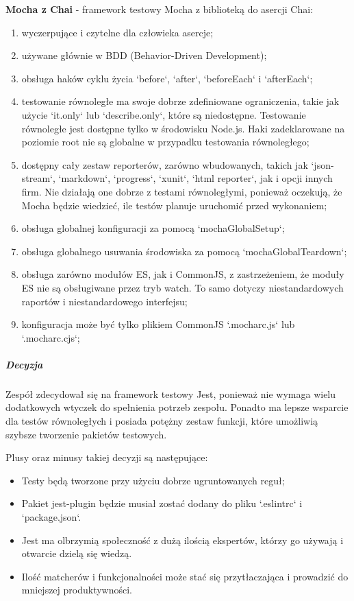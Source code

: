\documentclass[12pt, a4paper, twoside, openany]{book}
\begin{document}
\textbf{Mocha z Chai} - framework testowy Mocha z biblioteką do asercji Chai:
\begin{enumerate}[label=--]
    \item wyczerpujące i czytelne dla człowieka asercje;
    \item używane głównie w BDD (Behavior-Driven Development);
    \item obsługa haków cyklu życia `before`, `after`, `beforeEach` i `afterEach`;
    \item testowanie równoległe ma swoje dobrze zdefiniowane ograniczenia, takie jak użycie `it.only` lub `describe.only`, które są niedostępne. Testowanie równoległe jest dostępne tylko w środowisku Node.js. Haki zadeklarowane na poziomie root nie są globalne w przypadku testowania równoległego;
    \item dostępny cały zestaw reporterów, zarówno wbudowanych, takich jak `json-stream`, `markdown`, `progress`, `xunit`, `html reporter`, jak i opcji innych firm. Nie działają one dobrze z testami równoległymi, ponieważ oczekują, że Mocha będzie wiedzieć, ile testów planuje uruchomić przed wykonaniem;
    \item obsługa globalnej konfiguracji za pomocą `mochaGlobalSetup`;
    \item obsługa globalnego usuwania środowiska za pomocą `mochaGlobalTeardown`;
    \item obsługa zarówno modułów ES, jak i CommonJS, z zastrzeżeniem, że moduły ES nie są obsługiwane przez tryb watch. To samo dotyczy niestandardowych raportów i niestandardowego interfejsu;
    \item konfiguracja może być tylko plikiem CommonJS `.mocharc.js` lub `.mocharc.cjs`;
\end{enumerate}

\subparagraph{Decyzja\\}

Zespół zdecydował się na framework testowy Jest, ponieważ nie wymaga wielu dodatkowych wtyczek do spełnienia potrzeb zespołu. Ponadto ma lepsze wsparcie dla testów równoległych i posiada potężny zestaw funkcji, które umożliwią szybsze tworzenie pakietów testowych.

Plusy oraz minusy takiej decyzji są następujące:
\begin{itemize}
    \item Testy będą tworzone przy użyciu dobrze ugruntowanych reguł;
    \item Pakiet jest-plugin będzie musiał zostać dodany do pliku `.eslintrc` i `package.json`.
    \item Jest ma olbrzymią społeczność z dużą ilością ekspertów, którzy go używają i otwarcie dzielą się wiedzą.
    \item Ilość matcherów i funkcjonalności może stać się przytłaczająca i prowadzić do mniejszej produktywności.
\end{itemize}
\end{document}
